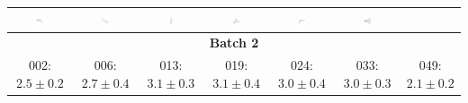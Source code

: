 \begin{tabular}{|c c c c c c c|}
\includegraphics[width = 0.14\textwidth]{2DImages/SAMPL5_060.pdf} & \includegraphics[width = 0.14\textwidth]{2DImages/SAMPL5_063.pdf} & \includegraphics[width = 0.14\textwidth]{2DImages/SAMPL5_071.pdf} & \includegraphics[width = 0.14\textwidth]{2DImages/SAMPL5_072.pdf} & \includegraphics[width = 0.14\textwidth]{2DImages/SAMPL5_081.pdf} & \includegraphics[width = 0.14\textwidth]{2DImages/SAMPL5_090.pdf} & \\ 
\hline 
\multicolumn{7}{|c|}{{\small\textbf{Batch 2}}}\\ 
{\scriptsize 002: $ 2.5 \pm 0.2 $ } & {\scriptsize 006: $ 2.7 \pm 0.4 $ } & {\scriptsize 013: $ 3.1 \pm 0.3 $ } & {\scriptsize 019: $ 3.1 \pm 0.4 $ } & {\scriptsize 024: $ 3.0 \pm 0.4 $ } & {\scriptsize 033: $ 3.0 \pm 0.3 $ } & {\scriptsize 049: $ 2.1 \pm 0.2 $ } \\ 

\end{tabular}

